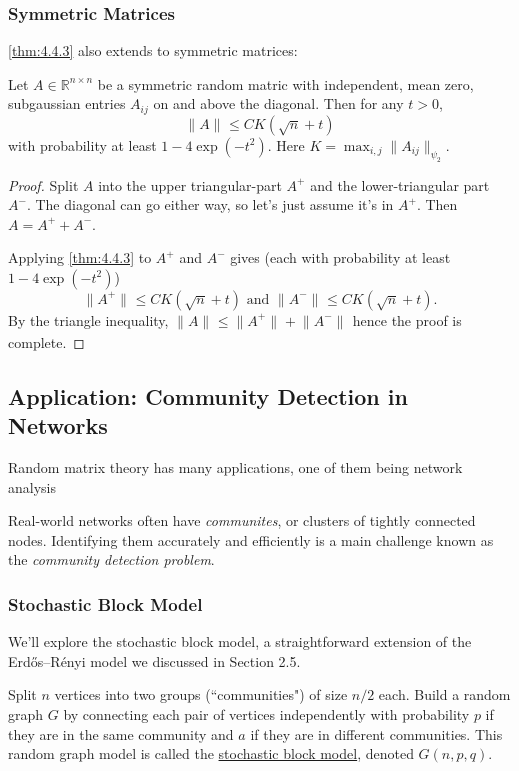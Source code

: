 \subsubsection{Symmetric Matrices}
\cref{thm:4.4.3} also extends to symmetric matrices:

\begin{corollary}[]
\label{cor:4.4.7}
Let $A \in \mathbb{R}^{n \times n}$ be a symmetric random matric with independent, mean zero, subgaussian 
entries $A_{ij}$ on and above the diagonal. Then for any $t > 0$, 
\[ \lVert A \rVert_{} \leq CK (\sqrt{n} + t) \]
with probability at least $1 - 4 \exp{(-t^2)}$. Here $K = \max_{i, j} \lVert A_{ij} \rVert_{\psi_2}$.
\end{corollary}

\begin{proof}
Split $A$ into the upper triangular-part $A^+$ and the lower-triangular part $A^-$. The diagonal can go 
either way, so let's just assume it's in $A^+$. Then $A = A^+ + A^-$.

Applying \cref{thm:4.4.3} to $A^+$ and $A^-$ gives (each with probability at least $1 - 4 \exp{(-t^2)}$)
\[ \lVert A^+ \rVert_{} \leq CK(\sqrt{n} + t) \text{ and } \lVert A^- \rVert_{} \leq CK(\sqrt{n} + t). \]
By the triangle inequality, $\lVert A \rVert_{} \leq \lVert A^+ \rVert_{} + \lVert A^- \rVert_{}$ hence the 
proof is complete.
\end{proof}



\subsection{Application: Community Detection in Networks}
Random matrix theory has many applications, one of them being network analysis

Real-world networks often have \textit{communites}, or clusters of tightly connected nodes. Identifying them 
accurately and efficiently is a main challenge known as the \textit{community detection problem}.


\subsubsection{Stochastic Block Model}
We'll explore the stochastic block model, a straightforward extension of the Erdős–Rényi model we discussed in 
Section 2.5.

\begin{definition}[]
\label{def:4.5.1}
Split $n$ vertices into two groups (``communities") of size $n/2$ each. Build a random graph $G$ by connecting 
each pair of vertices independently with probability $p$ if they are in the same community and $a$ if they are 
in different communities. This random graph model is called the \underline{stochastic block model}, denoted 
$G(n, p, q)$.
\end{definition}

